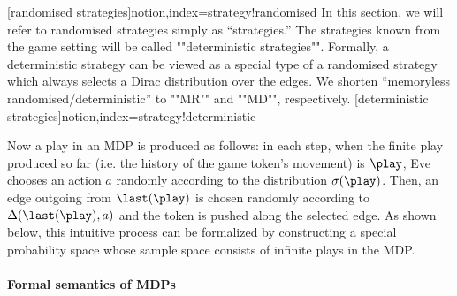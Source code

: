  [randomised strategies]{notion,index={strategy!randomised}}
%
In this section, we will refer to randomised strategies simply as ``strategies.'' The strategies known from the game setting will be called  ""deterministic strategies"". Formally, a deterministic strategy can be viewed as a special type of a randomised strategy which always selects a Dirac distribution over the edges. We shorten ``memoryless randomised/deterministic'' to ""MR"" and ""MD"", respectively.
[deterministic strategies]{notion,index={strategy!deterministic}}

Now a play in an MDP is produced as follows: in each step, when the finite play produced so far (i.e. the history of the game token's movement) is $\play$, Eve chooses an action $a$ randomly according to the distribution $\sigma(\play)$. Then, an edge outgoing from $\last(\play)$ is chosen randomly according to $\probTranFunc(\last(\play),a)$ and the token is pushed along the selected edge. As shown below, this intuitive process can be formalized by constructing a special probability space whose sample space consists of infinite plays in the MDP. 




\paragraph{Formal semantics of MDPs}


